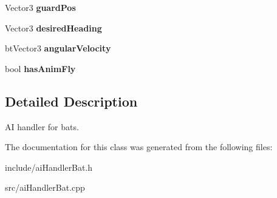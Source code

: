 \begin{DoxyCompactItemize}
\item 
\hypertarget{classAIHandlerBat_a008b65b419add70e4ad5500573f880fd}{
\-Vector3 {\bfseries guard\-Pos}}
\label{df/d90/classAIHandlerBat_a008b65b419add70e4ad5500573f880fd}

\item 
\hypertarget{classAIHandlerBat_ad93b8f03768fe541598e8b19a5a1a189}{
\-Vector3 {\bfseries desired\-Heading}}
\label{df/d90/classAIHandlerBat_ad93b8f03768fe541598e8b19a5a1a189}

\item 
\hypertarget{classAIHandlerBat_a525fbf04d219c9f02af802b0e35f8ee7}{
bt\-Vector3 {\bfseries angular\-Velocity}}
\label{df/d90/classAIHandlerBat_a525fbf04d219c9f02af802b0e35f8ee7}

\item 
\hypertarget{classAIHandlerBat_a3a7ef49c368568e5cfe3cbf49b18daa1}{
bool {\bfseries has\-Anim\-Fly}}
\label{df/d90/classAIHandlerBat_a3a7ef49c368568e5cfe3cbf49b18daa1}

\end{DoxyCompactItemize}


\subsection{\-Detailed \-Description}
\-A\-I handler for bats. 

\-The documentation for this class was generated from the following files\-:\begin{DoxyCompactItemize}
\item 
include/ai\-Handler\-Bat.\-h\item 
src/ai\-Handler\-Bat.\-cpp\end{DoxyCompactItemize}
